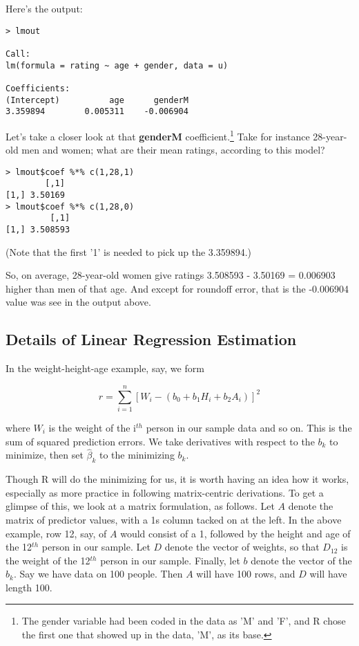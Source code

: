 Here's the output:

\begin{lstlisting}
> lmout

Call:
lm(formula = rating ~ age + gender, data = u)

Coefficients:
(Intercept)          age      genderM  
3.359894        0.005311    -0.006904  
\end{lstlisting}

Let's take a closer look at that \textbf{genderM}
coefficient.\footnote{The gender variable had been coded in the data as
'M' and 'F', and R chose the first one that showed up in the data, 'M',
as its base.}  Take for instance 28-year-old men and women; what are
their mean ratings, according to this model?

\begin{lstlisting}
> lmout$coef %*% c(1,28,1)
        [,1]
[1,] 3.50169
> lmout$coef %*% c(1,28,0)
         [,1]
[1,] 3.508593
\end{lstlisting}

(Note that the first '1' is needed to pick up the 3.359894.)

So, on average, 28-year-old women give ratings 3.508593 - 3.50169 =
0.006903 higher than men of that age.  And except for roundoff error,
that is the -0.006904 value was see in the output above.  

\subsection{Details of Linear Regression Estimation}
\label{lmdetails}

In the weight-height-age example, say, we form 

\begin{equation}
\label{rss}
r =
\sum_{i=1}^n [W_i - (b_0 + b_1 H_i + b_2 A_i)]^2
\end{equation}

where $W_i$ is the weight of the i$^{th}$ person in our sample data and
so on. This is the sum of squared prediction errors.  We take derivatives
with respect to the $b_k$ to minimize, then set $\widehat{\beta}_k$ to
the minimizing $b_k$.  

Though R will do the minimizing for us, it is worth having an idea how
it works, especially as more practice in following matrix-centric
derivations.  To get a glimpse of this, we look at a matrix formulation, as
follows.  Let $A$ denote the matrix of predictor values, with a 1s
column tacked on at the left.  In the above example, row 12, say, of $A$
would consist of a 1, followed by the height and age of the 12$^{th}$
person in our sample.  Let $D$ denote the vector of weights, so that
$D_{12}$ is the weight of the 12$^{th}$ person in our sample.  Finally,
let $b$ denote the vector of the $b_k$.  Say we have data on 100 people.
Then $A$ will have 100 rows, and $D$ will have length 100.

